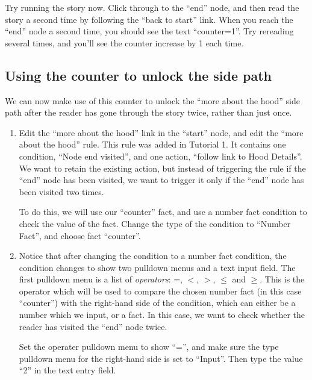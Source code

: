 \documentclass{article}
\begin{document}
Try running the story now. Click through to the ``end'' node, and 
then read the story a second time by following the ``back to start'' 
link. When you reach the ``end'' node a second time, you should see 
the text ``counter=1''. Try rereading several times, and you'll see 
the counter increase by 1 each time.

\subsection{Using the counter to unlock the side path}

We can now make use of this counter to unlock the ``more about the 
hood'' side path after the reader has gone through the story twice, 
rather than just once.

\begin{enumerate}
    \item Edit the ``more about the hood'' link in the ``start'' 
    node, and edit the ``more about the hood'' rule. This rule was 
    added in Tutorial 1. It contains one condition, ``Node end 
    visited'', and one action, ``follow link to Hood Details''. We 
    want to retain the existing action, but instead of triggering the 
    rule if the ``end'' node has been visited, we want to trigger it 
    only if the ``end'' node has been visited two times.
    
    To do this, we will use our ``counter'' fact, and use a number 
    fact condition to check the value of the fact. Change the type of 
    the condition to ``Number Fact'', and choose fact ``counter''.
    \item Notice that after changing the condition to a number fact 
    condition, the condition changes to show two pulldown menus and a 
    text input field. The first pulldown menu is a list of 
    \textit{operators}: =, $<$, $>$, $\le$ and $\ge$. This is the operator 
    which will be used to compare the chosen number fact (in this 
    case ``counter'') with the right-hand side of the condition, 
    which can either be a number which we input, or a fact. In this 
    case, we want to check whether the reader has visited the ``end'' 
    node twice.
    
    Set the operater pulldown menu to show ``='', and make sure the 
    type pulldown menu for the right-hand side is set to ``Input''. 
    Then type the value ``2'' in the text entry field.
\end{enumerate}
\end{document}
